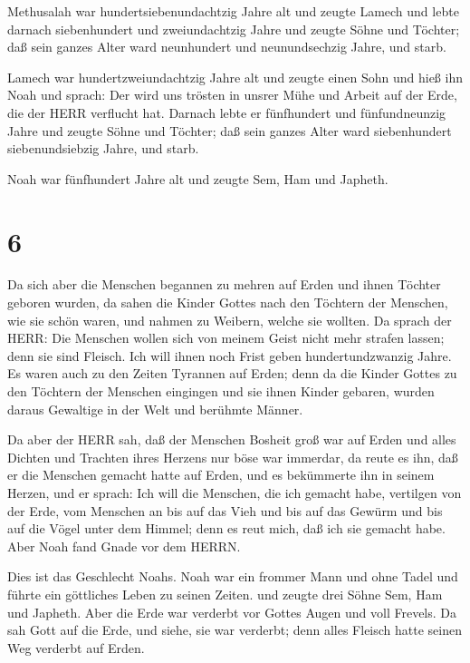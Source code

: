  Methusalah war hundertsiebenundachtzig Jahre alt und
zeugte Lamech  und lebte darnach siebenhundert und
zweiundachtzig Jahre und zeugte Söhne und Töchter;  daß
sein ganzes Alter ward neunhundert und neunundsechzig Jahre, und starb.

 Lamech war hundertzweiundachtzig Jahre alt und zeugte
einen Sohn  und hieß ihn Noah und sprach: Der wird uns
trösten in unsrer Mühe und Arbeit auf der Erde, die der HERR verflucht
hat.  Darnach lebte er fünfhundert und fünfundneunzig Jahre
und zeugte Söhne und Töchter;  daß sein ganzes Alter ward
siebenhundert siebenundsiebzig Jahre, und starb.

 Noah war fünfhundert Jahre alt und zeugte Sem, Ham und
Japheth.

\hypertarget{section-5}{%
\section{6}\label{section-5}}

 Da sich aber die Menschen begannen zu mehren auf Erden und
ihnen Töchter geboren wurden,  da sahen die Kinder Gottes
nach den Töchtern der Menschen, wie sie schön waren, und nahmen zu
Weibern, welche sie wollten.  Da sprach der HERR: Die
Menschen wollen sich von meinem Geist nicht mehr strafen lassen; denn
sie sind Fleisch. Ich will ihnen noch Frist geben hundertundzwanzig
Jahre.  Es waren auch zu den Zeiten Tyrannen auf Erden; denn
da die Kinder Gottes zu den Töchtern der Menschen eingingen und sie
ihnen Kinder gebaren, wurden daraus Gewaltige in der Welt und berühmte
Männer.

 Da aber der HERR sah, daß der Menschen Bosheit groß war auf
Erden und alles Dichten und Trachten ihres Herzens nur böse war
immerdar,  da reute es ihn, daß er die Menschen gemacht
hatte auf Erden, und es bekümmerte ihn in seinem Herzen, 
und er sprach: Ich will die Menschen, die ich gemacht habe, vertilgen
von der Erde, vom Menschen an bis auf das Vieh und bis auf das Gewürm
und bis auf die Vögel unter dem Himmel; denn es reut mich, daß ich sie
gemacht habe.  Aber Noah fand Gnade vor dem HERRN.

 Dies ist das Geschlecht Noahs. Noah war ein frommer Mann
und ohne Tadel und führte ein göttliches Leben zu seinen Zeiten.
 und zeugte drei Söhne Sem, Ham und Japheth. 
Aber die Erde war verderbt vor Gottes Augen und voll Frevels.
 Da sah Gott auf die Erde, und siehe, sie war verderbt;
denn alles Fleisch hatte seinen Weg verderbt auf Erden.

